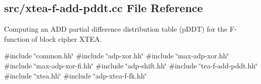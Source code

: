 \hypertarget{xtea-f-add-pddt_8cc}{\subsection{src/xtea-\/f-\/add-\/pddt.cc \-File \-Reference}
\label{xtea-f-add-pddt_8cc}
}


\-Computing an \-A\-D\-D partial difference distribution table (p\-D\-D\-T) for the \-F-\/function of block cipher \-X\-T\-E\-A.  


{\ttfamily \#include \char`\"{}common.\-hh\char`\"{}}\*
{\ttfamily \#include \char`\"{}adp-\/xor.\-hh\char`\"{}}\*
{\ttfamily \#include \char`\"{}max-\/adp-\/xor.\-hh\char`\"{}}\*
{\ttfamily \#include \char`\"{}max-\/adp-\/xor-\/fi.\-hh\char`\"{}}\*
{\ttfamily \#include \char`\"{}adp-\/shift.\-hh\char`\"{}}\*
{\ttfamily \#include \char`\"{}tea-\/f-\/add-\/pddt.\-hh\char`\"{}}\*
{\ttfamily \#include \char`\"{}xtea.\-hh\char`\"{}}\*
{\ttfamily \#include \char`\"{}adp-\/xtea-\/f-\/fk.\-hh\char`\"{}}\*
